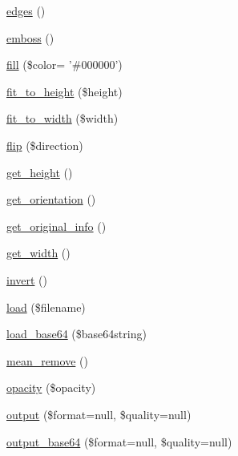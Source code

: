 \begin{DoxyCompactItemize}
\item 
\hyperlink{classabeautifulsite_1_1_simple_image_aed0804dc7416329172ab55bcbf1d41b7}{edges} ()
\item 
\hyperlink{classabeautifulsite_1_1_simple_image_aabc8c1473621bfe3e064dd0a756c935e}{emboss} ()
\item 
\hyperlink{classabeautifulsite_1_1_simple_image_aaa59492eca3655d941d74c92eff212e9}{fill} (\$color= '\#000000')
\item 
\hyperlink{classabeautifulsite_1_1_simple_image_a8336e743a25f5301892696cd7c394f1f}{fit\-\_\-to\-\_\-height} (\$height)
\item 
\hyperlink{classabeautifulsite_1_1_simple_image_ac94ed3e74548edbf50883dc09790ab16}{fit\-\_\-to\-\_\-width} (\$width)
\item 
\hyperlink{classabeautifulsite_1_1_simple_image_afbed21df0630ae4d62c6ba38edd6f9d1}{flip} (\$direction)
\item 
\hyperlink{classabeautifulsite_1_1_simple_image_a0acd49b80218568ea04e7a5886373c54}{get\-\_\-height} ()
\item 
\hyperlink{classabeautifulsite_1_1_simple_image_a6bb3cbd0b8cb4156b2521365fca79529}{get\-\_\-orientation} ()
\item 
\hyperlink{classabeautifulsite_1_1_simple_image_a2514a0242e2b19b8b5fcbd7a79db5527}{get\-\_\-original\-\_\-info} ()
\item 
\hyperlink{classabeautifulsite_1_1_simple_image_abb10ccd258503d273acaf265bf1b1535}{get\-\_\-width} ()
\item 
\hyperlink{classabeautifulsite_1_1_simple_image_a70a743c63f97d5bbfdb2cdab7d186938}{invert} ()
\item 
\hyperlink{classabeautifulsite_1_1_simple_image_a585c262d16bad21a05af8804df8372b2}{load} (\$filename)
\item 
\hyperlink{classabeautifulsite_1_1_simple_image_a21c21cee2c0a9cd9e8965a684f50e8e8}{load\-\_\-base64} (\$base64string)
\item 
\hyperlink{classabeautifulsite_1_1_simple_image_a4f2623f77a0eb2993c39668604b9d028}{mean\-\_\-remove} ()
\item 
\hyperlink{classabeautifulsite_1_1_simple_image_add5b914f35ec96d98f9e3026693a627d}{opacity} (\$opacity)
\item 
\hyperlink{classabeautifulsite_1_1_simple_image_a1d8a0c4ee571db448e556caed12028d1}{output} (\$format=null, \$quality=null)
\item 
\hyperlink{classabeautifulsite_1_1_simple_image_acd08ab8d9a2213db91dc8a4cd533fedc}{output\-\_\-base64} (\$format=null, \$quality=null)

\end{DoxyCompactItemize}
